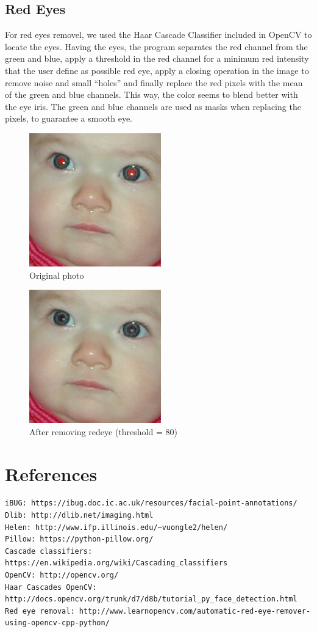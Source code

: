 \documentclass[12pt,a4paper]{article}
\begin{document}
\subsection{Red Eyes}
    For red eyes removel, we used the Haar Cascade Classifier included in OpenCV to locate the eyes. Having the eyes, the program separates the red channel from the green and blue, apply a threshold in the red channel for a minimum red intensity that the user define as possible red eye, apply a closing operation in the image to remove noise and small ``holes'' and finally replace the red pixels with the mean of the green and blue channels. This way, the color seems to blend better with the eye iris.
    The green and blue channels are used as masks when replacing the pixels, to guarantee a smooth eye.

    \begin{figure}[!hb]
        \centering
        \includegraphics[scale=0.5]{redeye5.jpg}
        \caption{Original photo}
        \label{Redeye}
    \end{figure}

    \begin{figure}[!hb]
        \centering
        \includegraphics[scale=0.5]{redeye-removed.jpg}
        \caption{After removing redeye (threshold = 80)}
        \label{Redeye removed}
    \end{figure}

\section{References}

\begin{verbatim}
iBUG: https://ibug.doc.ic.ac.uk/resources/facial-point-annotations/
Dlib: http://dlib.net/imaging.html
Helen: http://www.ifp.illinois.edu/~vuongle2/helen/ 
Pillow: https://python-pillow.org/ 
Cascade classifiers: https://en.wikipedia.org/wiki/Cascading_classifiers 
OpenCV: http://opencv.org/ 
Haar Cascades OpenCV: http://docs.opencv.org/trunk/d7/d8b/tutorial_py_face_detection.html 
Red eye removal: http://www.learnopencv.com/automatic-red-eye-remover-using-opencv-cpp-python/
\end{verbatim}
\end{document}
